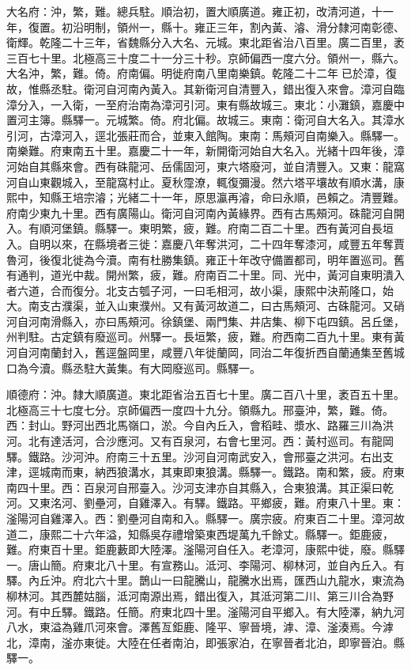 \begin{pinyinscope}
大名府：沖，繁，難。總兵駐。順治初，置大順廣道。雍正初，改清河道，十一年，復置。初沿明制，領州一，縣十。雍正三年，割內黃、濬、滑分隸河南彰德、衛輝。乾隆二十三年，省魏縣分入大名、元城。東北距省治八百里。廣二百里，袤三百七十里。北極高三十度二十一分三十秒。京師偏西一度六分。領州一，縣六。大名沖，繁，難。倚。府南偏。明徙府南八里南樂鎮。乾隆二十二年已於漳，復故，惟縣丞駐。衛河自河南內黃入。其新衛河自清豐入，錯出復入來會。漳河自臨漳分入，一入衛，一至府治南為漳河引河。東有縣故城三。東北：小灘鎮，嘉慶中置河主簿。縣驛一。元城繁。倚。府北偏。故城三。東南：衛河自大名入。其漳水引河，古漳河入，逕北張莊而合，並東入館陶。東南：馬頰河自南樂入。縣驛一。南樂難。府東南五十里。嘉慶二十一年，新開衛河始自大名入。光緒十四年後，漳河始自其縣來會。西有硃龍河、岳儒固河，東六塔廢河，並自清豐入。又東：龍窩河自山東觀城入，至龍窩村止。夏秋霪潦，輒復彌漫。然六塔平壤故有順水溝，康熙中，知縣王培宗濬；光緒二十一年，原思瀛再濬，命曰永順，邑賴之。清豐難。府南少東九十里。西有廣陽山。衛河自河南內黃緣界。西有古馬頰河。硃龍河自開入。有順河堡鎮。縣驛一。東明繁，疲，難。府南二百二十里。西有黃河自長垣入。自明以來，在縣境者三徙：嘉慶八年奪洪河，二十四年奪漆河，咸豐五年奪賈魯河，後復北徙為今瀆。南有杜勝集鎮。雍正十年改守備置都司，明年置巡司。舊有通判，道光中裁。開州繁，疲，難。府南百二十里。同、光中，黃河自東明潰入者六道，合而復分。北支古瓠子河，一曰毛相河，故小渠，康熙中決荊隆口，始大。南支古濮渠，並入山東濮州。又有黃河故道二，曰古馬頰河、古硃龍河。又硝河自河南滑縣入，亦曰馬頰河。徐鎮堡、兩門集、井店集、柳下屯四鎮。呂丘堡，州判駐。古定鎮有廢巡司。州驛一。長垣繁，疲，難。府西南二百九十里。東有黃河自河南蘭封入，舊逕盤岡里，咸豐八年徙蘭岡，同治二年復折西自蘭通集至舊城口為今瀆。縣丞駐大黃集。有大岡廢巡司。縣驛一。

順德府：沖。隸大順廣道。東北距省治五百七十里。廣二百八十里，袤百五十里。北極高三十七度七分。京師偏西一度四十九分。領縣九。邢臺沖，繁，難。倚。西：封山。野河出西北馬嶺口，淤。今自內丘入，會稻畦、漿水、路羅三川為洪河。北有達活河，合沙應河。又有百泉河，右會七里河。西：黃村巡司。有龍岡驛。鐵路。沙河沖。府南三十五里。沙河自河南武安入，會邢臺之洪河。右出支津，逕城南而東，納西狼溝水，其東即東狼溝。縣驛一。鐵路。南和繁，疲。府東南四十里。西：百泉河自邢臺入。沙河支津亦自其縣入，合東狼溝。其正渠曰乾河。又東洺河、劉壘河，自雞澤入。有驛。鐵路。平鄉疲，難。府東八十里。東：滏陽河自雞澤入。西：劉壘河自南和入。縣驛一。廣宗疲。府東百二十里。漳河故道二，康熙二十六年溢，知縣吳存禮增築東西堤萬九千餘丈。縣驛一。鉅鹿疲，難。府東百十里。鉅鹿藪即大陸澤。滏陽河自任入。老漳河，康熙中徙，廢。縣驛一。唐山簡。府東北八十里。有宣務山。泜河、李陽河、柳林河，並自內丘入。有驛。內丘沖。府北六十里。鵲山一曰龍騰山，龍騰水出焉，匯西山九龍水，東流為柳林河。其西麓姑腦，泜河南源出焉，錯出復入，其泜河第二川、第三川合為野河。有中丘驛。鐵路。任簡。府東北四十里。滏陽河自平鄉入。有大陸澤，納九河八水，東溢為雞爪河來會。澤舊亙鉅鹿、隆平、寧晉境，滹、漳、滏湊焉。今滹北，漳南，滏亦東徙。大陸在任者南泊，即張家泊，在寧晉者北泊，即寧晉泊。縣驛一。


\end{pinyinscope}
